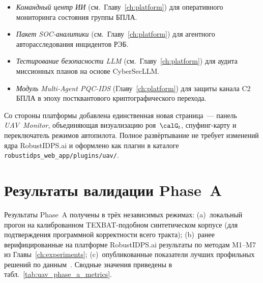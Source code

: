 \begin{itemize}\setlength\itemsep{0.1em}
\item \emph{Командный центр ИИ} (см.\ Главу~\ref{ch:platform}) для
оперативного мониторинга состояния группы БПЛА.
\item \emph{Пакет SOC-аналитики} (см.\ Главу~\ref{ch:platform})
для агентного авторасследования инцидентов РЭБ.
\item \emph{Тестирование безопасности LLM} (см.\ Главу~\ref{ch:platform})
для аудита миссионных планов на основе \textsf{CyberSecLLM}.
\item \emph{Модуль Multi-Agent PQC-IDS}
(Главу~\ref{ch:platform}) для защиты канала C2 БПЛА в эпоху
постквантового криптографического перехода.
\end{itemize}

Со стороны платформы добавлена единственная новая страница~--- панель
\emph{UAV~Monitor}, объединяющая визуализацию роя~$\calG_t$, спуфинг-карту
и переключатель режимов автопилота. Полное развёртывание не требует
изменений ядра \textsf{RobustIDPS.ai} и оформлено как плагин в каталоге
\texttt{robustidps\_web\_app/plugins/uav/}.


\section{Результаты валидации Phase~A}
\label{sec:uav_phase_a_results}

Результаты Phase~A получены в трёх независимых режимах: (a)~локальный
прогон на калиброванном TEXBAT-подобном синтетическом корпусе (для
подтверждения программной корректности всего тракта); (b)~ранее
верифицированные на платформе \textsf{RobustIDPS.ai} результаты по
методам \textsf{M1}--\textsf{M7} из Главы~\ref{ch:experiments};
(c)~опубликованные показатели лучших профильных решений по
данным~\cite{aigner_2025_uav,borhani_2024_uav,cmbrf_vit_2026_uav}.
Сводные значения приведены в табл.~\ref{tab:uav_phase_a_metrics}.

